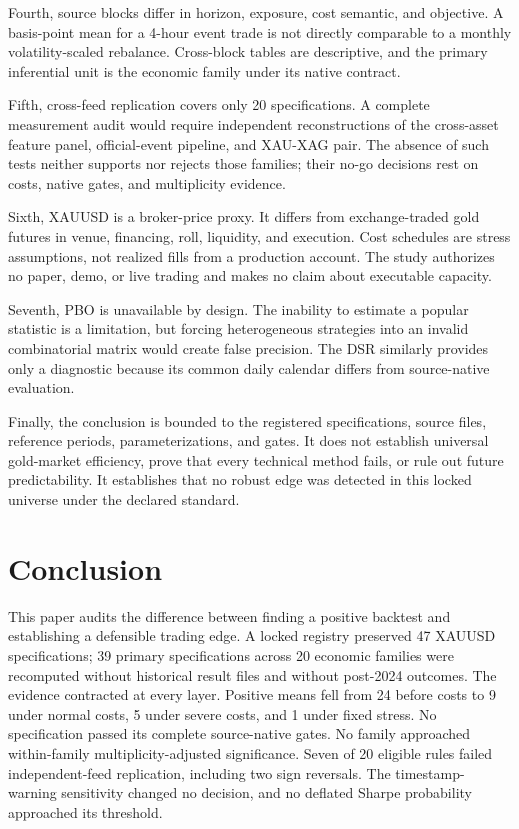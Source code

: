 Fourth, source blocks differ in horizon, exposure, cost semantic, and objective. A basis-point mean for a 4-hour event trade is not directly comparable to a monthly volatility-scaled rebalance. Cross-block tables are descriptive, and the primary inferential unit is the economic family under its native contract.

Fifth, cross-feed replication covers only 20 specifications. A complete measurement audit would require independent reconstructions of the cross-asset feature panel, official-event pipeline, and XAU-XAG pair. The absence of such tests neither supports nor rejects those families; their no-go decisions rest on costs, native gates, and multiplicity evidence.

Sixth, XAUUSD is a broker-price proxy. It differs from exchange-traded gold futures in venue, financing, roll, liquidity, and execution. Cost schedules are stress assumptions, not realized fills from a production account. The study authorizes no paper, demo, or live trading and makes no claim about executable capacity.

Seventh, PBO is unavailable by design. The inability to estimate a popular statistic is a limitation, but forcing heterogeneous strategies into an invalid combinatorial matrix would create false precision. The DSR similarly provides only a diagnostic because its common daily calendar differs from source-native evaluation.

Finally, the conclusion is bounded to the registered specifications, source files, reference periods, parameterizations, and gates. It does not establish universal gold-market efficiency, prove that every technical method fails, or rule out future predictability. It establishes that no robust edge was detected in this locked universe under the declared standard.

\section{Conclusion}\label{sec:conclusion}

This paper audits the difference between finding a positive backtest and establishing a defensible trading edge. A locked registry preserved 47 XAUUSD specifications; 39 primary specifications across 20 economic families were recomputed without historical result files and without post-2024 outcomes. The evidence contracted at every layer. Positive means fell from 24 before costs to 9 under normal costs, 5 under severe costs, and 1 under fixed stress. No specification passed its complete source-native gates. No family approached within-family multiplicity-adjusted significance. Seven of 20 eligible rules failed independent-feed replication, including two sign reversals. The timestamp-warning sensitivity changed no decision, and no deflated Sharpe probability approached its threshold.

